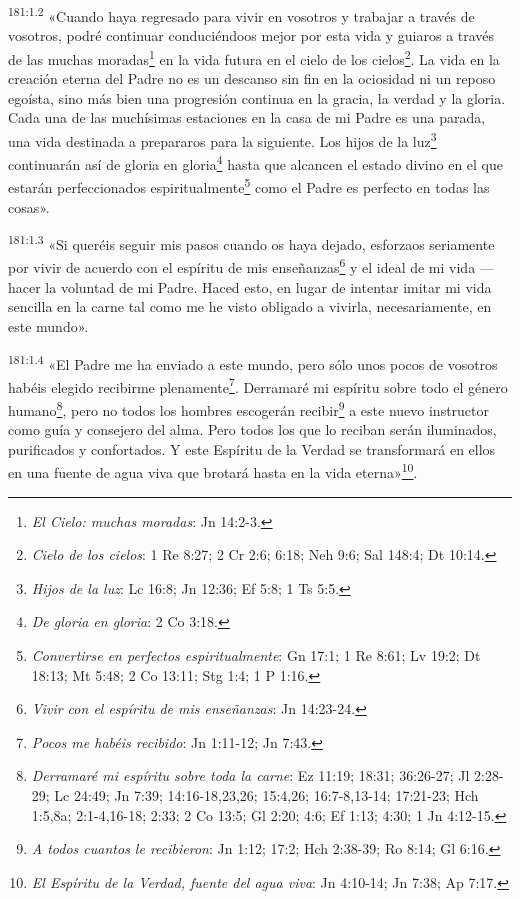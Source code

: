 \par
\textsuperscript{181:1.2} «Cuando haya regresado para vivir en vosotros y trabajar a través de vosotros, podré continuar conduciéndoos mejor por esta vida y guiaros a través de las muchas moradas\footnote{\textit{El Cielo: muchas moradas}: Jn 14:2-3.} en la vida futura en el cielo de los cielos\footnote{\textit{Cielo de los cielos}: 1 Re 8:27; 2 Cr 2:6; 6:18; Neh 9:6; Sal 148:4; Dt 10:14.}. La vida en la creación eterna del Padre no es un descanso sin fin en la ociosidad ni un reposo egoísta, sino más bien una progresión continua en la gracia, la verdad y la gloria. Cada una de las muchísimas estaciones en la casa de mi Padre es una parada, una vida destinada a prepararos para la siguiente. Los hijos de la luz\footnote{\textit{Hijos de la luz}: Lc 16:8; Jn 12:36; Ef 5:8; 1 Ts 5:5.} continuarán así de gloria en gloria\footnote{\textit{De gloria en gloria}: 2 Co 3:18.} hasta que alcancen el estado divino en el que estarán perfeccionados espiritualmente\footnote{\textit{Convertirse en perfectos espiritualmente}: Gn 17:1; 1 Re 8:61; Lv 19:2; Dt 18:13; Mt 5:48; 2 Co 13:11; Stg 1:4; 1 P 1:16.} como el Padre es perfecto en todas las cosas».

\par
\textsuperscript{181:1.3} «Si queréis seguir mis pasos cuando os haya dejado, esforzaos seriamente por vivir de acuerdo con el espíritu de mis enseñanzas\footnote{\textit{Vivir con el espíritu de mis enseñanzas}: Jn 14:23-24.} y el ideal de mi vida ---hacer la voluntad de mi Padre. Haced esto, en lugar de intentar imitar mi vida sencilla en la carne tal como me he visto obligado a vivirla, necesariamente, en este mundo».

\par
\textsuperscript{181:1.4} «El Padre me ha enviado a este mundo, pero sólo unos pocos de vosotros habéis elegido recibirme plenamente\footnote{\textit{Pocos me habéis recibido}: Jn 1:11-12; Jn 7:43.}. Derramaré mi espíritu sobre todo el género humano\footnote{\textit{Derramaré mi espíritu sobre toda la carne}: Ez 11:19; 18:31; 36:26-27; Jl 2:28-29; Lc 24:49; Jn 7:39; 14:16-18,23,26; 15:4,26; 16:7-8,13-14; 17:21-23; Hch 1:5,8a; 2:1-4,16-18; 2:33; 2 Co 13:5; Gl 2:20; 4:6; Ef 1:13; 4:30; 1 Jn 4:12-15.}, pero no todos los hombres escogerán recibir\footnote{\textit{A todos cuantos le recibieron}: Jn 1:12; 17:2; Hch 2:38-39; Ro 8:14; Gl 6:16.} a este nuevo instructor como guía y consejero del alma. Pero todos los que lo reciban serán iluminados, purificados y confortados. Y este Espíritu de la Verdad se transformará en ellos en una fuente de agua viva que brotará hasta en la vida eterna»\footnote{\textit{El Espíritu de la Verdad, fuente del agua viva}: Jn 4:10-14; Jn 7:38; Ap 7:17.}.

